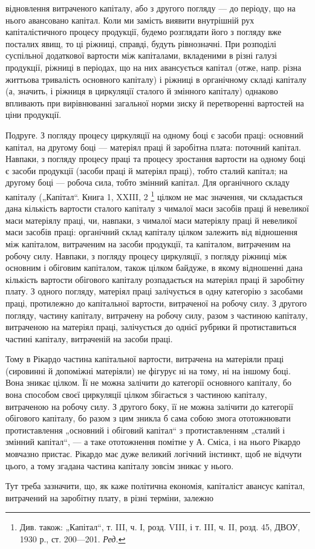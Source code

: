 \parcont{}  %
відновлення витраченого капіталу, або з другого погляду — до періоду,
що на нього авансовано капітал. Коли ми замість виявити внутрішній
рух капіталістичного процесу продукції, будемо розглядати його з погляду
вже посталих явищ, то ці ріжниці, справді, будуть рівнозначні. При
розподілі суспільної додаткової вартости між капіталами, вкладеними
в різні галузі продукції, ріжниці в періодах, що на них авансується
капітал (отже, напр. різна життьова тривалість основного капіталу) і
ріжниці в органічному складі капіталу (а, значить, і ріжниця в циркуляції
сталого й змінного капіталу) однаково впливають при вирівнюванні загальної
норми зиску й перетворенні вартостей на ціни продукції.

Подруге. З погляду процесу циркуляції на одному боці є засоби
праці: основний капітал, на другому боці — матеріял праці й заробітна
плата: поточний капітал. Навпаки, з погляду процесу праці та процесу
зростання вартости на одному боці є засоби продукції (засоби праці й
матеріял праці), тобто сталий капітал; на другому боці — робоча сила, тобто
змінний капітал. Для органічного складу капіталу („Капітал“. Книга 1,
XXIII, 2 \footnote*{
Див. також: „Капітал“, т. III, ч. І, розд. VIII, і т. III, ч. II, розд. 45, ДВОУ,
1930 р., ст. 200—201. \emph{Ред.}
} цілком не має значення, чи складається дана кількість вартости
сталого капіталу з чималої маси засобів праці й невеликої маси
матеріялу праці, чи, навпаки, з чималої маси матеріялу праці й невеликої
маси засобів праці: органічний склад капіталу цілком залежить від відношення
між капіталом, витраченим на засоби продукції, та капіталом, витраченим
на робочу силу. Навпаки, з погляду процесу циркуляції, з погляду
ріжниці між основним і обіговим капіталом, також цілком байдуже,
в якому відношенні дана кількість вартости обігового капіталу розпадається
на матеріял праці й заробітну плату. З одного погляду, матеріял
праці залічується в одну категорію з засобами праці, протилежно до
капітальної вартости, витраченої на робочу силу. З другого погляду,
частину капіталу, витрачену на робочу силу, разом з частиною капіталу,
витраченою на матеріял праці, залічується до однієї рубрики й протиставиться
частині капіталу, витраченій на засоби праці.

Тому в Рікардо частина капітальної вартости, витрачена на матеріяли
праці (сировинні й допоміжні матеріяли) не фігурує ні на тому, ні на іншому
боці. Вона зникає цілком. Її не можна залічити до категорії основного
капіталу, бо вона способом своєї циркуляції цілком збігається
з частиною капіталу, витраченою на робочу силу. З другого боку, її не
можна залічити до категорії обігового капіталу, бо разом з цим зникла
б сама собою змога ототожнювати протиставлення „основний і обіговий
капітал“ з протиставленням „сталий і змінний капітал“, — а таке ототожнення
помітне у А. Сміса, і на нього Рікардо мовчазно пристає. Рікардо
має дуже великий логічний інстинкт, щоб не відчути цього, а тому згадана
частина капіталу зовсім зникає у нього.

Тут треба зазначити, що, як каже політична економія, капіталіст
авансує капітал, витрачений на заробітну плату, в різні терміни, залежно
\parbreak{}  %
